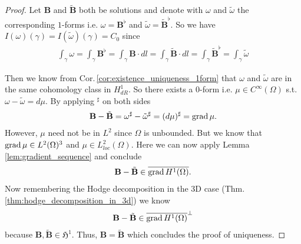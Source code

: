 \documentclass[../master_thesis.tex]{subfiles}
\begin{document}
\begin{proof}
    Let $\mathbf{B}$ and $\tilde{\mathbf{B}}$ both be solutions and denote with $\omega$ 
    and $\tilde{\omega}$ the corresponding $1$-forms i.e. $\omega =
    \mathbf{B}^\flat$ and $\tilde{\omega} = \tilde{\mathbf{B}}^\flat$. 
    So we have $I(\omega)(\gamma) = I(\tilde{\omega})(\gamma) = C_0$
    since 
    \begin{align*}
        \int_\gamma \omega = \int_\gamma \mathbf{B}^\flat = 
        \int_\gamma \mathbf{B} \cdot dl = \int_\gamma \tilde{\mathbf{B}}\cdot dl 
        = \int_\gamma \tilde{\mathbf{B}}^\flat = \int_\gamma \tilde{\omega}
    \end{align*}

    Then we know from Cor.\,\ref{cor:existence_uniqueness_1form} 
    that $\omega$ and $\tilde{\omega}$ are in the 
    same cohomology class in $H^1_{dR}$. So there exists a $0$-form i.e. 
    $\mu \in C^\infty(\Omega)$ s.t. $\omega - \tilde{\omega} = d\mu$.
    By applying $^\sharp$ on both sides
    \begin{align*}
        \mathbf{B} - \tilde{\mathbf{B}} 
        = \omega^\sharp - \tilde{\omega}^\sharp
        = (d\mu)^\sharp = \operatorname{grad} \mu.
    \end{align*}
    However, $\mu$ need not be in $L^2$ since $\Omega$ is unbounded.
    But we know that $\operatorname{grad} \mu \in L^2(\Omega)^3$ and 
    $\mu \in L^2_{loc}(\Omega)$. 
    Here we can now apply Lemma \ref{lem:gradient_sequence} and conclude
    \begin{align*}
        \mathbf{B} - \tilde{\mathbf{B}} \in \overline{\operatorname{grad} H^1(\Omega)}.
    \end{align*}
    Now remembering the Hodge decomposition in the 3D case (Thm.\,\ref{thm:hodge_decomposition_in_3d}) we know 
    \begin{align*}
        \mathbf{B} - \tilde{\mathbf{B}} \in \overline{\operatorname{grad} H^1(\Omega)}^\perp
    \end{align*}
    because $\mathbf{B}, \tilde{\mathbf{B}} \in \mathfrak{H}^1$.
    Thus, $\mathbf{B} = \tilde{\mathbf{B}}$ which concludes the proof of uniqueness.
\end{proof}
\end{document}
